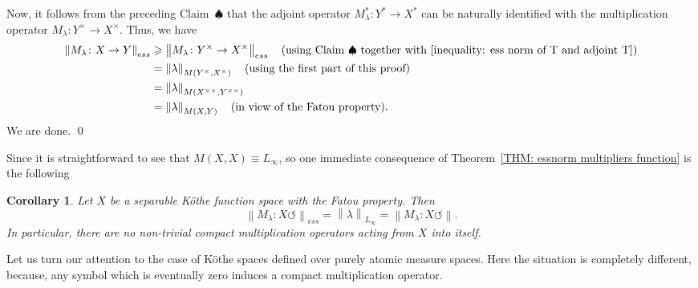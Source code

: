 \documentclass[11pt]{amsart}
\theoremstyle{definition}
\theoremstyle{definition}
\theoremstyle{definition}
\newtheorem{corollary}[theorem]{Corollary}
\theoremstyle{definition}
\theoremstyle{definition}
\theoremstyle{definition}
\theoremstyle{definition}
\theoremstyle{definition}
\numberwithin{equation}{section}
\numberwithin{equation}{section}
\numberwithin{equation}{section}
\theoremstyle{definition}
\theoremstyle{definition}
\theoremstyle{definition}
\theoremstyle{definition}
\theoremstyle{definition}
\theoremstyle{definition}
\newcommand{\norm}[1]{\left\lVert#1\right\rVert}
\renewenvironment{proof}{\noindent {\bf Proof.}}{\qed}
\begin{document}
\begin{proof}
	\vspace{5pt}
	Now, it follows from the preceding Claim~$\spadesuit$ that the adjoint operator $M_{\lambda}^* \colon Y^* \rightarrow X^*$ can be naturally identified
	with the multiplication operator $M_{\lambda} \colon Y^{\times} \rightarrow X^{\times}$. Thus, we have
	\begin{align*}
		\norm{M_{\lambda} \colon X \rightarrow Y}_{ess}
			& \geqslant \norm{M_{\lambda} \colon Y^{\times} \rightarrow X^{\times}}_{ess} \quad (\text{using Claim~$\spadesuit$ together with \eqref{inequality: ess norm of T and adjoint T}}) \\
			& = \norm{\lambda}_{M(Y^{\times},X^{\times})} \quad (\text{using the first part of this proof}) \\
			& = \norm{\lambda}_{M(X^{\times\times},Y^{\times\times})} \\
			& = \norm{\lambda}_{M(X,Y)} \quad (\text{in view of the Fatou property}).
	\end{align*}
	We are done.
\end{proof}

Since it is straightforward to see that $M(X,X) \equiv L_\infty$, so one immediate consequence of Theorem~\ref{THM: essnorm multipliers function} is the following

\begin{corollary} \label{COR: compact function X to X}
	{\it Let $X$ be a separable K{\" o}the function space with the Fatou property. Then
	\begin{equation*}
		\norm{M_{\lambda} \colon X \circlearrowleft}_{ess} = \norm{\lambda}_{L_{\infty}} = \norm{M_{\lambda} \colon X \circlearrowleft}.
	\end{equation*}
	In particular, there are no non-trivial compact multiplication operators acting from $X$ into itself.}
\end{corollary}

Let us turn our attention to the case of K{\" o}the spaces defined over purely atomic measure spaces.
Here the situation is completely different, because, any symbol which is eventually zero induces a compact multiplication operator.
\end{document}
